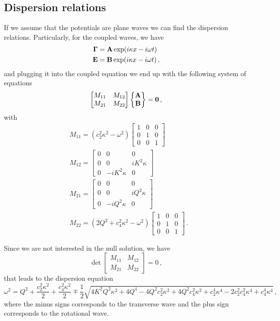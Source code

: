 \documentclass[12pt]{article}
\begin{document}
\subsection{Dispersion relations}
If we assume that the potentials are plane waves we can find the dispersion relations. Particularly, for the coupled waves, we have
\begin{align*}
\vb{\Gamma} &= \vb{A}\exp(i\kappa x - i\omega t)\\
\vb{E} &= \vb{B}\exp(i\kappa x - i\omega t)\, ,
\end{align*}
and plugging it into the coupled equation we end up with the following system of equations
\[\begin{bmatrix}
M_{11} &M_{12}\\
M_{21} &M_{22}\end{bmatrix}
\begin{Bmatrix} \vb{A}\\ \vb{B}\end{Bmatrix}
= \vb{0}\, ,\]
with
\begin{align*}
&M_{11} =
(c_{2}^{2} \kappa^{2} - \omega^{2})
\begin{bmatrix}
1 & 0 & 0\\
0 & 1 & 0 \\
0 & 0 & 1
\end{bmatrix}\\
&M_{12} =
\begin{bmatrix}
0 & 0 & 0\\
0 & 0 & i K^{2} \kappa\\
0 & -i K^{2} \kappa & 0
\end{bmatrix}\\
&M_{21} =
\begin{bmatrix}
0 & 0 & 0 \\
0 & 0 & i Q^{2} \kappa \\
0 & -i Q^{2} \kappa & 0 
\end{bmatrix}\\
&M_{22} =
(2 Q^{2} + c_{4}^{2} \kappa^{2} - \omega^{2})\begin{bmatrix}
1 &0 &0\\
0 &1 &0\\
0 &0 &1
\end{bmatrix}\, .
\end{align*}

Since we are not interested in the null solution, we have
\[\det\begin{bmatrix}
M_{11} &M_{12}\\
M_{21} &M_{22}\end{bmatrix}=0\, ,\]
that leads to the dispersion equation 
\begin{equation*}
\omega^2 = Q^{2} + \frac{c_{2}^{2} \kappa^{2}}{2} + \frac{c_{4}^{2} \kappa^{2}}{2} \mp \frac{1}{2} \sqrt{4 K^{2} Q^{2} \kappa^{2} + 4 Q^{4} - 4 Q^{2} c_{2}^{2} \kappa^{2} + 4 Q^{2} c_{4}^{2} \kappa^{2} + c_{2}^{4} \kappa^{4} - 2 c_{2}^{2} c_{4}^{2} \kappa^{4} + c_{4}^{4} \kappa^{4}}\, ,
\end{equation*}
where the minus signs corresponds to the transverse wave and the plus sign corresponds to the rotational wave.
\end{document}
